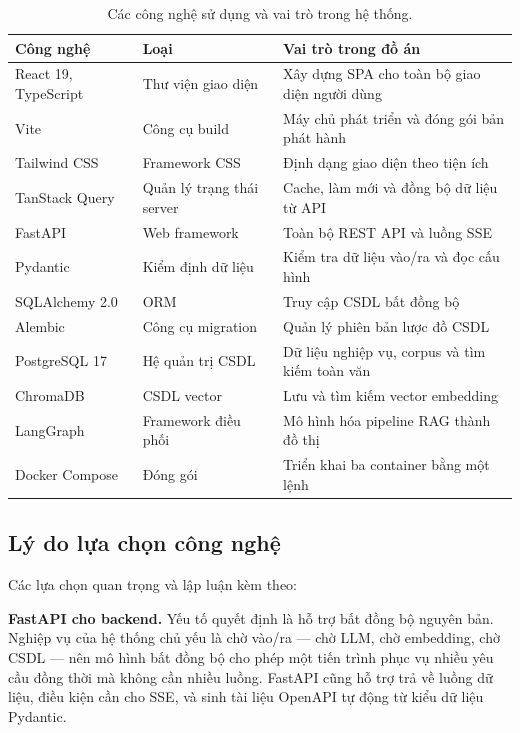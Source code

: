 \documentclass[12pt,a4paper]{report}
\numberwithin{equation}{chapter}
\numberwithin{figure}{chapter}
\numberwithin{table}{chapter}
\begin{document}
\begin{table}[htp]
    \centering
    \caption{Các công nghệ sử dụng và vai trò trong hệ thống.}
    \label{tab:cong-nghe}
    \begin{tabular}{p{3.4cm}p{4.2cm}p{6.2cm}}
        \toprule
        \textbf{Công nghệ} & \textbf{Loại} & \textbf{Vai trò trong đồ án} \\
        \midrule
        React 19, TypeScript & Thư viện giao diện & Xây dựng SPA cho toàn bộ
        giao diện người dùng \\
        Vite & Công cụ build & Máy chủ phát triển và đóng gói bản phát hành \\
        Tailwind CSS & Framework CSS & Định dạng giao diện theo tiện ích \\
        TanStack Query & Quản lý trạng thái server & Cache, làm mới và đồng bộ
        dữ liệu từ API \\
        FastAPI & Web framework & Toàn bộ REST API và luồng SSE \\
        Pydantic & Kiểm định dữ liệu & Kiểm tra dữ liệu vào/ra và đọc cấu hình \\
        SQLAlchemy 2.0 & ORM & Truy cập CSDL bất đồng bộ \\
        Alembic & Công cụ migration & Quản lý phiên bản lược đồ CSDL \\
        PostgreSQL 17 & Hệ quản trị CSDL & Dữ liệu nghiệp vụ, corpus và tìm kiếm
        toàn văn \\
        ChromaDB & CSDL vector & Lưu và tìm kiếm vector embedding \\
        LangGraph & Framework điều phối & Mô hình hóa pipeline RAG thành đồ thị \\
        Docker Compose & Đóng gói & Triển khai ba container bằng một lệnh \\
        \bottomrule
    \end{tabular}
\end{table}

\subsection{Lý do lựa chọn công nghệ}
Các lựa chọn quan trọng và lập luận kèm theo:

\textbf{FastAPI cho backend.} Yếu tố quyết định là hỗ trợ bất đồng bộ nguyên bản.
Nghiệp vụ của hệ thống chủ yếu là chờ vào/ra --- chờ LLM, chờ embedding, chờ CSDL
--- nên mô hình bất đồng bộ cho phép một tiến trình phục vụ nhiều yêu cầu đồng
thời mà không cần nhiều luồng. FastAPI cũng hỗ trợ trả về luồng dữ liệu, điều
kiện cần cho SSE, và sinh tài liệu OpenAPI tự động từ kiểu dữ liệu Pydantic.
\end{document}
